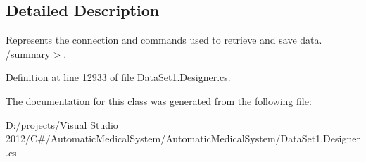 \subsection{Detailed Description}
Represents the connection and commands used to retrieve and save data. /summary$>$. 

Definition at line 12933 of file DataSet1.Designer.cs.

The documentation for this class was generated from the following file:\begin{CompactItemize}
\item 
D:/projects/Visual Studio 2012/C\#/AutomaticMedicalSystem/AutomaticMedicalSystem/DataSet1.Designer.cs\end{CompactItemize}
